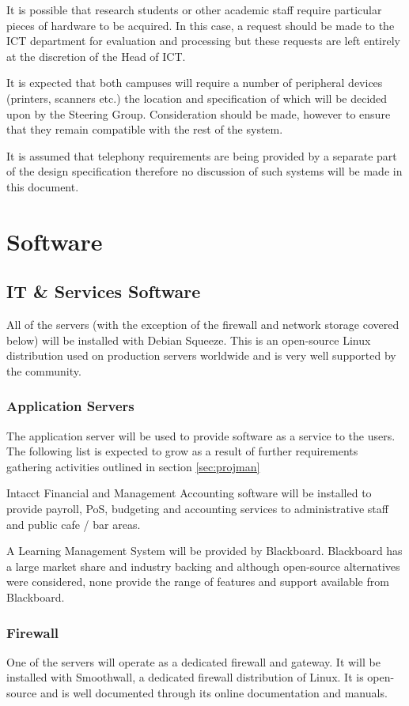 \documentclass[a4paper, twoside]{article}
\begin{document}
It is possible that research students or other academic staff require particular
pieces of hardware to be acquired. In this case, a request should be made to the
ICT department for evaluation and processing but these requests are left
entirely at the discretion of the Head of ICT.

It is expected that both campuses will require a number of peripheral devices
(printers, scanners etc.) the location and specification of which will be
decided upon by the Steering Group. Consideration should be made, however to
ensure that they remain compatible with the rest of the system.

It is assumed that telephony requirements are being provided by a separate part
of the design specification therefore no discussion of such systems will be made
in this document.

\section{Software}
\subsection{IT \& Services Software}
All of the servers (with the exception of the firewall and network storage
covered below) will be installed with Debian Squeeze. This is an open-source
Linux distribution used on production servers worldwide\cite{debian} and is
very well supported by the community.

\subsubsection{Application Servers}
The application server will be used to provide software as a service to the
users. The following list is expected to grow as a result of further
requirements gathering activities outlined in section \ref{sec:projman}

Intacct Financial and Management Accounting software will be installed to
provide payroll, PoS, budgeting and accounting services to administrative staff
and public cafe / bar areas.

A Learning Management System will be provided by Blackboard. Blackboard has a
large market share and industry backing \cite{bb} and although open-source
alternatives were considered, none provide the range of features and support
available from Blackboard.

\subsubsection{Firewall}
One of the servers will operate as a dedicated firewall and gateway. It will be
installed with Smoothwall, a dedicated firewall distribution of Linux. It is
open-source and is well documented through its online documentation and
manuals.
\end{document}
